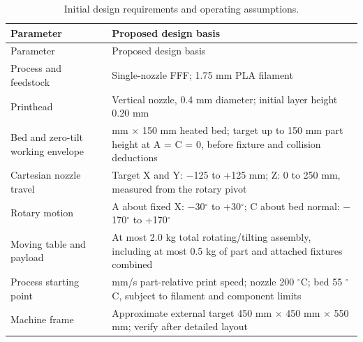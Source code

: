 \documentclass[12pt,a4paper]{article}
\begin{document}
\Needspace{240pt}
\begingroup
\footnotesize
\setlength{\tabcolsep}{4pt}
\renewcommand{\arraystretch}{1.12}
\begin{longtable}[]{@{}
  >{\raggedright\arraybackslash}p{}
  >{\raggedright\arraybackslash}p{}@{}}
\caption{Initial design requirements and operating assumptions.}\tabularnewline
\toprule\noalign{}
\begin{minipage}[b]{\linewidth}\raggedright
Parameter
\end{minipage} & \begin{minipage}[b]{\linewidth}\raggedright
Proposed design basis
\end{minipage} \\
\midrule\noalign{}
\endfirsthead
\toprule\noalign{}
\begin{minipage}[b]{\linewidth}\raggedright
Parameter
\end{minipage} & \begin{minipage}[b]{\linewidth}\raggedright
Proposed design basis
\end{minipage} \\
\midrule\noalign{}
\endhead
\bottomrule\noalign{}
\endlastfoot
Process and feedstock & Single-nozzle FFF; 1.75 mm PLA filament \\
Printhead & Vertical nozzle, 0.4 mm diameter; initial layer height 0.20 mm \\
Bed and zero-tilt working envelope & 150 mm \ensuremath{\times} 150 mm heated bed; target up to 150 mm
  part height at A = C = 0, before fixture and collision deductions \\
Cartesian nozzle travel & Target X and Y: \ensuremath{-}125 to +125 mm; Z: 0 to 250 mm, measured from the
  rotary pivot \\
Rotary motion & A about fixed X: \ensuremath{-}30\ensuremath{^\circ} to +30\ensuremath{^\circ}; C about
  bed normal: \ensuremath{-}170\ensuremath{^\circ} to +170\ensuremath{^\circ} \\
Moving table and payload & At most 2.0 kg total rotating/tilting assembly, including at most 0.5 kg of
  part and attached fixtures combined \\
Process starting point & 30 mm/s part-relative print speed; nozzle 200 \ensuremath{^\circ}C; bed 55
  \ensuremath{^\circ}C, subject to filament and component limits \\
Machine frame & Approximate external target 450 mm \ensuremath{\times} 450 mm \ensuremath{\times} 550 mm;
  verify after detailed layout \\
\end{longtable}
\endgroup
\end{document}
